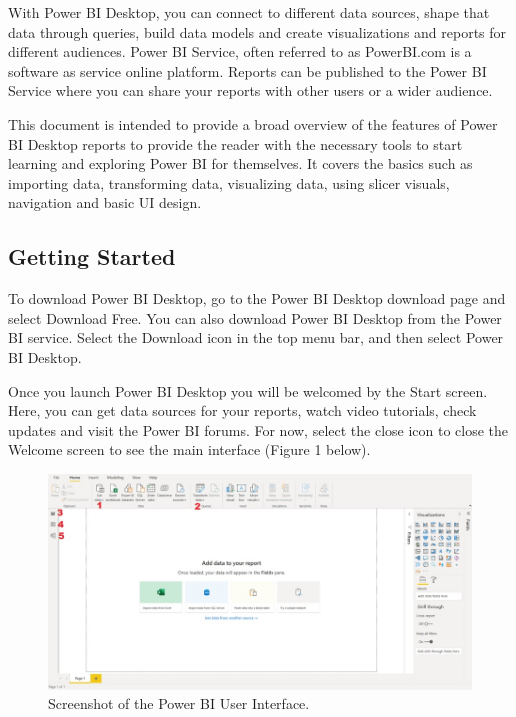 \documentclass[
]{book}
\begin{document}
With Power BI Desktop, you can connect to different data sources, shape that data through queries, build data models and create visualizations and reports for different audiences. Power BI Service, often referred to as PowerBI.com is a software as service online platform. Reports can be published to the Power BI Service where you can share your reports with other users or a wider audience.

This document is intended to provide a broad overview of the features of Power BI Desktop reports to provide the reader with the necessary tools to start learning and exploring Power BI for themselves. It covers the basics such as importing data, transforming data, visualizing data, using slicer visuals, navigation and basic UI design.

\hypertarget{getting-started}{%
\subsection{Getting Started}\label{getting-started}}

To download Power BI Desktop, go to the Power BI Desktop download page and select Download Free. You can also download Power BI Desktop from the Power BI service. Select the Download icon in the top menu bar, and then select Power BI Desktop.

Once you launch Power BI Desktop you will be welcomed by the Start screen. Here, you can get data sources for your reports, watch video tutorials, check updates and visit the Power BI forums. For now, select the close icon to close the Welcome screen to see the main interface (Figure 1 below).

\begin{figure}
\centering
\includegraphics{bi1.jpg}
\caption{Screenshot of the Power BI User Interface.}
\end{figure}
\end{document}
